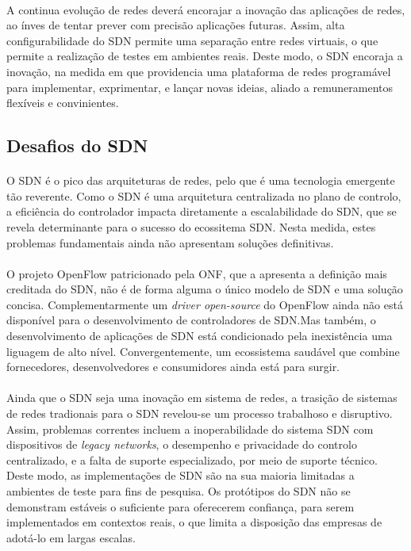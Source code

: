 \documentclass{llncs}
\begin{document}
\paragraph{}
A continua evolução de redes deverá encorajar a inovação das aplicações de redes, ao ínves de tentar prever com precisão aplicações futuras. Assim, alta configurabilidade do
SDN permite uma separação entre redes virtuais, o que permite a realização de testes em ambientes reais. Deste modo, o SDN encoraja a inovação, na medida em que providencia 
uma plataforma de redes programável para implementar, exprimentar, e lançar novas ideias, aliado a remuneramentos flexíveis e convinientes. \cite{paper1}
\subsection{Desafios do SDN}
\paragraph{}
O SDN é o pico das arquiteturas de redes, pelo que é uma tecnologia emergente tão reverente. 
Como o SDN é uma arquitetura centralizada no plano de controlo, a eficiência do controlador impacta diretamente a escalabilidade do SDN, 
que se revela determinante para o sucesso do ecossitema SDN. Nesta medida, estes problemas fundamentais ainda não apresentam soluções definitivas.\cite{performance}
\paragraph{}
O projeto OpenFlow patricionado pela ONF, que a apresenta a definição mais creditada do SDN, não é de forma alguma o único modelo de SDN e uma solução concisa. 
Complementarmente um \textit{driver open-source} do OpenFlow ainda não está disponível para o desenvolvimento de controladores de SDN.Mas também, o desenvolvimento de aplicações de SDN está condicionado pela inexistência uma liguagem de alto nível. 
Convergentemente, um ecossistema saudável que combine fornecedores, desenvolvedores e consumidores ainda está para surgir. \cite{paper1} 
\paragraph{}
Ainda que o SDN seja uma inovação em sistema de redes, a trasição de sistemas de redes tradionais para o SDN revelou-se um processo trabalhoso e disruptivo. Assim, problemas correntes incluem
a inoperabilidade  do sistema SDN com dispositivos de \textit{legacy networks}, o desempenho e privacidade do controlo centralizado, e a falta de suporte especializado, por meio de suporte técnico.
Deste modo, as implementações de SDN são na sua maioria limitadas a ambientes de teste para fins de pesquisa. Os protótipos do SDN não se demonstram estáveis o suficiente para oferecerem confiança, para serem implementados em contextos reais, o que limita a disposição das empresas de adotá-lo em largas escalas.\cite{paper1}
\end{document}

